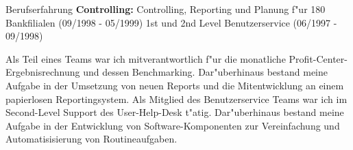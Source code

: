 \begin{rubric}{Berufserfahrung}
\entry*[06/1997 - 05/1999] \textbf{Controlling:}\newline
{} 
Controlling, Reporting und Planung f"ur 180 Bankfilialen (09/1998 - 05/1999)\newline
1st und 2nd Level Benutzerservice (06/1997 - 09/1998)\axelvspace

Als Teil eines Teams war ich mitverantwortlich f"ur die monatliche Profit-Center-Ergebnisrechnung und dessen Benchmarking. Dar"uberhinaus bestand meine Aufgabe in der Umsetzung von neuen Reports und die Mitentwicklung an einem papierlosen Reportingsystem.
Als Mitglied des Benutzerservice Teams war ich im Second-Level Support des User-Help-Desk t"atig. Dar"uberhinaus bestand meine Aufgabe in der Entwicklung von Software-Komponenten zur Vereinfachung und Automatisisierung von Routineaufgaben.
\sloppy
\end{rubric}
